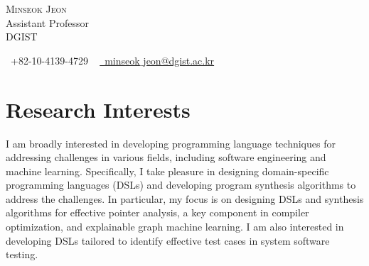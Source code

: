 \documentclass[letterpaper,11pt]{article}
\begin{document}

\begin{center}
    {\Huge \scshape Minseok Jeon} \\ \vspace{1pt}
    Assistant Professor\\\vspace{1pt}
    DGIST\\\vspace{1pt}
        
    \small \raisebox{-0.1\height}\faPhone\ +82-10-4139-4729 ~ \href{mailto:minseok_jeon@dgist.ac.kr}{\raisebox{-0.2\height}\faEnvelope\  \underline{minseok$\_$jeon@dgist.ac.kr}} ~ 
    \vspace{-8pt}
\end{center}

\section{Research Interests}
I am broadly interested in developing programming language techniques for addressing challenges in various fields, including software engineering and machine learning.
%
Specifically, I take pleasure in designing domain-specific programming languages (DSLs) and developing program synthesis algorithms to address the challenges.
%
In particular, my focus is on designing DSLs and synthesis algorithms for effective pointer analysis, a key component in compiler optimization, and explainable graph machine learning. 
I am also interested in developing DSLs tailored to identify effective test cases in system software testing.
%
\end{document}
